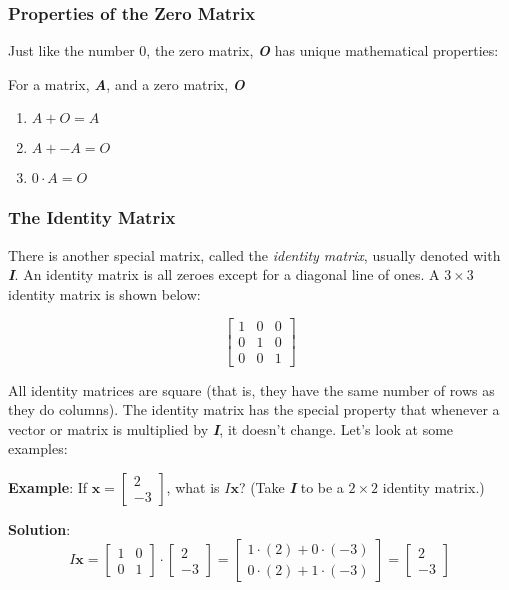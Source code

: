 \subsubsection{Properties of the Zero Matrix}
Just like the number 0, the zero matrix, \textbf{\textit{O}} has unique
mathematical properties:
\begin{mdframed}[style = important, frametitle = {Properties of the Zero Matrix}]
For a matrix, \textbf{\textit{A}}, and a zero matrix, \textbf{\textit{O}}
\begin{enumerate}
\item $\mathbf{\mathit{A}} + \mathbf{\mathit{O}} = \mathbf{\mathit{A}}$
\item $\mathbf{\mathit{A}} + \mathbf{\mathit{-A}} = \mathbf{\mathit{O}}$
\item $0 \cdot \mathbf{\mathit{A}} = \mathbf{\mathit{O}}$
\end{enumerate}
\end{mdframed}

\subsubsection{The Identity Matrix}
There is another special matrix, called the \textit{identity matrix}, usually denoted with \textbf{\textit{I}}. An identity matrix
is all zeroes except for a diagonal line of ones. A $3 \times 3$ identity
matrix is shown below:

$$\begin{bmatrix}
1 & 0 & 0\\
0 & 1 & 0\\
0 & 0 & 1
\end{bmatrix}$$

All identity matrices are square (that is, they have the same number of rows
as they do columns). The identity matrix has the special property that
whenever a vector or matrix is multiplied by \textbf{\textit{I}}, it doesn't
change. Let's look at some examples:

\textbf{Example}: If $\mathbf{x} = \begin{bmatrix}
2\\
-3
\end{bmatrix}$, what is $\mathbf{\mathit{I}}\mathbf{x}$? (Take \textbf{\textit{
I}} to be a $2 \times 2$ identity matrix.)

\textbf{Solution}: $$\mathbf{\mathit{I}} \mathbf{x} = \begin{bmatrix}
1 & 0 \\
0 & 1
\end{bmatrix} \cdot \begin{bmatrix}
2 \\
-3
\end{bmatrix} = \begin{bmatrix}
1 \cdot (2) + 0 \cdot (-3)\\
0 \cdot (2) + 1 \cdot (-3)
\end{bmatrix} = \begin{bmatrix}
2\\
-3
\end{bmatrix}$$

